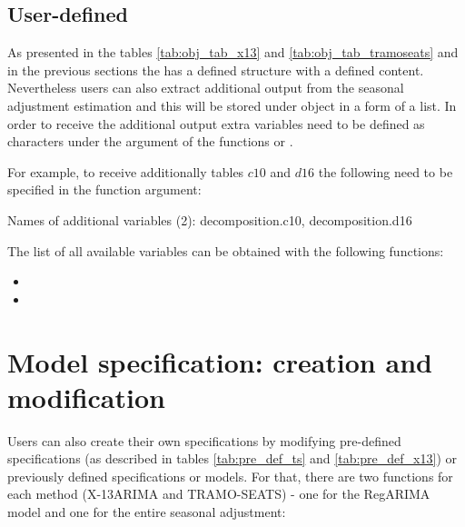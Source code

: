 \documentclass[article]{jss}
\begin{document}
\hypertarget{user-def}{%
\subsection{User-defined}\label{user-def}}

As presented in the tables \ref{tab:obj_tab_x13} and
\ref{tab:obj_tab_tramoseats} and in the previous sections the
 has a defined structure with a defined content.
Nevertheless users can also extract additional output from the seasonal
adjustment estimation and this will be stored under 
object in a form of a list. In order to receive the additional output
extra variables need to be defined as characters under the argument
 of the functions  or .

For example, to receive additionally tables \(c10\) and \(d16\) the
following need to be specified in the function argument:

\begin{CodeChunk}


\begin{CodeOutput}
Names of additional variables (2):
decomposition.c10, decomposition.d16
\end{CodeOutput}
\end{CodeChunk}

The list of all available variables can be obtained with the following
functions:

\begin{itemize}
\item
\item
\end{itemize}

\hypertarget{user-def-spec}{%
\section{Model specification: creation and
modification}\label{user-def-spec}}

Users can also create their own specifications by modifying pre-defined
specifications (as described in tables \ref{tab:pre_def_ts} and
\ref{tab:pre_def_x13}) or previously defined specifications or models.
For that, there are two functions for each method (X-13ARIMA and
TRAMO-SEATS) - one for the RegARIMA model and one for the entire
seasonal adjustment:
\end{document}
